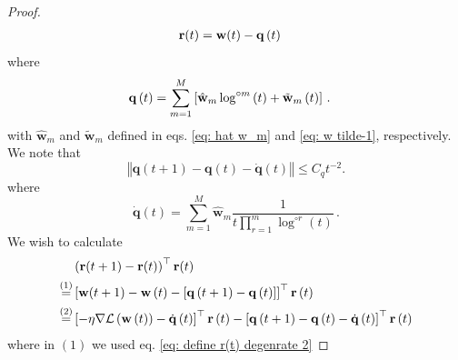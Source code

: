 \documentclass[twoside,11pt,english]{article}
\begin{document}
{\begin{proof}
\begin{align}
\mathbf{r}(t) & =\mathbf{w}(t)-\mathbf{q}\left(t\right)\label{eq: define r(t) degenrate 2}
\end{align}
where
\begin{align}
\mathbf{q}\left(t\right) & =\sum_{m=1}^{M}\left[\hat{\mathbf{w}}_{m}\log^{\circ m}\left(t\right)+\tilde{\mathbf{w}}_{m}\left(t\right)\right]\,.\label{eq: q(t)}
\end{align}
with $\hat{\mathbf{w}}_{m}$ and $\tilde{\mathbf{w}}_{m}$ 
defined in eqs. \ref{eq: hat w_m} and \ref{eq: w tilde-1}, respectively. We note that
\begin{equation}
\left\Vert \mathbf{q}\left(t+1\right)-\mathbf{q}\left(t\right)-\dot{\mathbf{q}}\left(t\right)\right\Vert \leq C_{q}t^{-2}.\label{eq: q second derivative}
\end{equation}
where
\begin{equation}
\dot{\mathbf{q}}\left(t\right)=\sum_{m=1}^{M}\hat{\mathbf{w}}_{m}\frac{1}{t\prod_{r=1}^{m}\log^{\circ r}\left(t\right)}\,.\label{eq: q dot}
\end{equation}
We wish to calculate 
\begin{align}
 & \left(\mathbf{r}(t+1)-\mathbf{r}(t)\right)^{\top}\mathbf{r}(t)\nonumber \\
\overset{\left(1\right)}{=} & \left[\mathbf{w}(t+1)-\mathbf{w}\left(t\right)-\left[\mathbf{q}\left(t+1\right)-\mathbf{q}\left(t\right)\right]\right]^{\top}\mathbf{r}\left(t\right)\nonumber \\
\overset{\left(2\right)}{=} & \left[-\eta\nabla\mathcal{L}\left(\mathbf{w}\left(t\right)\right)-\dot{\mathbf{q}}\left(t\right)\right]^{\top}\mathbf{r}\left(t\right)-\left[\mathbf{q}\left(t+1\right)-\mathbf{q}\left(t\right)-\dot{\mathbf{q}}\left(t\right)\right]^{\top}\mathbf{r}\left(t\right)\label{eq: r correlation}
\end{align}
where in $\left(1\right)$ we used eq. \ref{eq: define r(t) degenrate 2}

\end{proof}}
\end{document}
